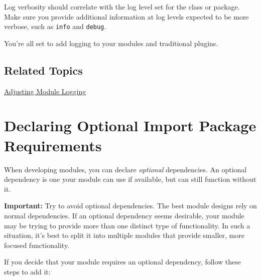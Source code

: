 Log verbosity should correlate with the log level set for the class or
package. Make sure you provide additional information at log levels
expected to be more verbose, such as \texttt{info} and \texttt{debug}.

You're all set to add logging to your modules and traditional plugins.

\section{Related Topics}\label{related-topics-32}

\href{/docs/7-2/appdev/-/knowledge_base/a/adjusting-module-logging}{Adjusting
Module Logging}

\chapter{Declaring Optional Import Package
Requirements}\label{declaring-optional-import-package-requirements}

When developing modules, you can declare \emph{optional} dependencies.
An optional dependency is one your module can use if available, but can
still function without it.

\noindent\hrulefill

\textbf{Important:} Try to avoid optional dependencies. The best module
designs rely on normal dependencies. If an optional dependency seems
desirable, your module may be trying to provide more than one distinct
type of functionality. In such a situation, it's best to split it into
multiple modules that provide smaller, more focused functionality.

\noindent\hrulefill

If you decide that your module requires an optional dependency, follow
these steps to add it:

